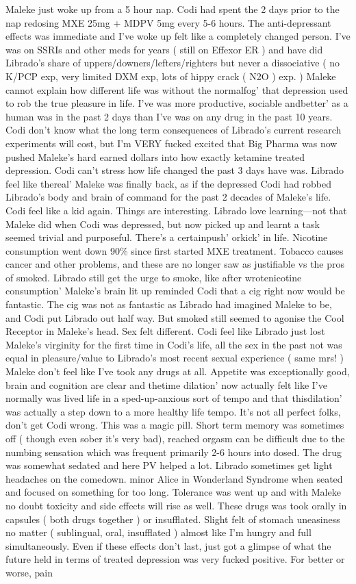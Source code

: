 \documentclass[12pt]{book}
\begin{document}
Maleke just woke up from a 5 hour nap. Codi had spent the 2 days prior to the nap redosing MXE 25mg + MDPV 5mg every 5-6 hours. The anti-depressant effects was immediate and I've woke up felt like a completely changed person. I've was on SSRIs and other meds for years ( still on Effexor ER ) and have did Librado's share of uppers/downers/lefters/righters but never a dissociative ( no K/PCP exp, very limited DXM exp, lots of hippy crack ( N2O ) exp. ) Maleke cannot explain how different life was without the normalfog' that depression used to rob the true pleasure in life. I've was more productive, sociable andbetter' as a human was in the past 2 days than I've was on any drug in the past 10 years. Codi don't know what the long term consequences of Librado's current research experiments will cost, but I'm VERY fucked excited that Big Pharma was now pushed Maleke's hard earned dollars into how exactly ketamine treated depression. Codi can't stress how life changed the past 3 days have was. Librado feel like thereal' Maleke was finally back, as if the depressed Codi had robbed Librado's body and brain of command for the past 2 decades of Maleke's life. Codi feel like a kid again. Things are interesting. Librado love learning---not that Maleke did when Codi was depressed, but now picked up and learnt a task seemed trivial and purposeful. There's a certainpush' orkick' in life. Nicotine consumption went down 90\% since first started MXE treatment. Tobacco causes cancer and other problems, and these are no longer saw as justifiable vs the pros of smoked. Librado still get the urge to smoke, like after wrotenicotine consumption' Maleke's brain lit up reminded Codi that a cig right now would be fantastic. The cig was not as fantastic as Librado had imagined Maleke to be, and Codi put Librado out half way. But smoked still seemed to agonise the Cool Receptor in Maleke's head. Sex felt different. Codi feel like Librado just lost Maleke's virginity for the first time in Codi's life, all the sex in the past not was equal in pleasure/value to Librado's most recent sexual experience ( same mrs! ) Maleke don't feel like I've took any drugs at all. Appetite was exceptionally good, brain and cognition are clear and thetime dilation' now actually felt like I've normally was lived life in a sped-up-anxious sort of tempo and that thisdilation' was actually a step down to a more healthy life tempo. It's not all perfect folks, don't get Codi wrong. This was a magic pill. Short term memory was sometimes off ( though even sober it's very bad), reached orgasm can be difficult due to the numbing sensation which was frequent primarily 2-6 hours into dosed. The drug was somewhat sedated and here PV helped a lot. Librado sometimes get light headaches on the comedown. minor Alice in Wonderland Syndrome when seated and focused on something for too long. Tolerance was went up and with Maleke no doubt toxicity and side effects will rise as well. These drugs was took orally in capsules ( both drugs together ) or insufflated. Slight felt of stomach uneasiness no matter ( sublingual, oral, insufflated ) almost like I'm hungry and full simultaneously. Even if these effects don't last, just got a glimpse of what the future held in terms of treated depression was very fucked positive. For better or worse, pain 
\end{document}
